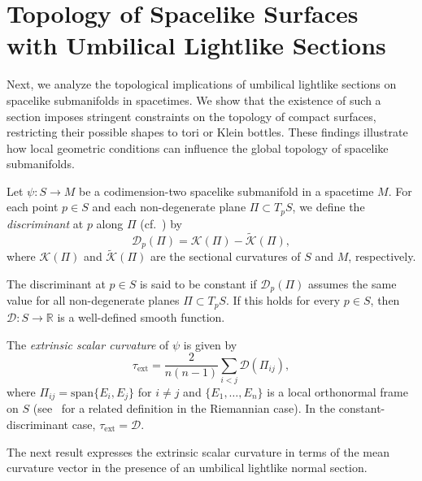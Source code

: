 \documentclass[11pt]{article}
\numberwithin{equation}{section}
\begin{document}
	
	
	\section{Topology of Spacelike Surfaces with Umbilical Lightlike Sections}\label{sec:topo_ULS}
	
Next, we analyze the topological implications of umbilical lightlike sections on spacelike submanifolds in spacetimes. We show that the existence of such a section imposes stringent constraints on the topology of compact surfaces, restricting their possible shapes to tori or Klein bottles. These findings illustrate how local geometric conditions can influence the global topology of spacelike submanifolds.

Let \(\psi\colon S\to M\) be a codimension-two spacelike submanifold in a spacetime \(M\). For each point \(p\in S\) and each non-degenerate plane \(\Pi\subset T_pS\), we define the \emph{discriminant} at \(p\) along \(\Pi\) (cf.~\cite{oneill2}) by
\[
\mathscr{D}_p(\Pi)
= \mathscr{K}(\Pi) - \widetilde{\mathscr{K}}(\Pi),
\]
where \(\mathscr{K}(\Pi)\) and \(\widetilde{\mathscr{K}}(\Pi)\) are the sectional curvatures of \(S\) and \(M\), respectively.

The discriminant at $p \in S$ is said to be constant if $\mathscr{D}_p(\Pi)$ assumes the same value for all non-degenerate planes $\Pi \subset T_pS$. If this holds for every \(p\in S\), then $\mathscr{D}\colon S\to \mathbb{R}$ is a well-defined smooth function.

The \emph{extrinsic scalar curvature} of \(\psi\) is given by
\[
\tau_{\mathrm{ext}}
= \frac{2}{n(n-1)} \sum_{i<j} \mathscr{D}(\Pi_{ij}),
\]
where \(\Pi_{ij} = \mathrm{span}\{E_i, E_j\}\) for \(i \neq j\) and \(\{E_1, \dots, E_n\}\) is a local orthonormal frame on \(S\) (see~\cite{chen74} for a related definition in the Riemannian case). In the constant-discriminant case, \(\tau_{\mathrm{ext}} = \mathscr{D}\).

The next result expresses the extrinsic scalar curvature in terms of the mean curvature vector in the presence of an umbilical lightlike normal section.
\end{document}

